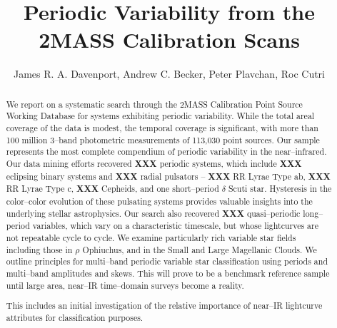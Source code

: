 \documentclass[]{emulateapj}
\begin{document}
 
\title{Periodic Variability from the 2MASS Calibration Scans}


\author{James R. A. Davenport,
Andrew C. Becker,
Peter Plavchan,
Roc Cutri}

 



\begin{abstract}

We report on a systematic search through the 2MASS Calibration Point
Source Working Database for systems exhibiting periodic variability.
While the total areal coverage of the data is modest, the temporal
coverage is significant, with more than 100 million 3--band
photometric measurements of 113,030 point sources.  Our sample
represents the most complete compendium of periodic variability in the
near--infrared.  Our data mining efforts recovered {\bf XXX} periodic
systems, which include {\bf XXX} eclipsing binary systems and {\bf
  XXX} radial pulsators -- {\bf XXX} RR Lyrae Type ab, {\bf XXX} RR
Lyrae Type c, {\bf XXX} Cepheids, and one short--period $\delta$ Scuti
star.  Hysteresis in the color--color evolution of these pulsating
systems provides valuable insights into the underlying stellar
astrophysics.  Our search also recovered {\bf XXX} quasi--periodic
long--period variables, which vary on a characteristic timescale, but
whose lightcurves are not repeatable cycle to cycle.  We examine
particularly rich variable star fields including those in $\rho$
Ophiuchus, and in the Small and Large Magellanic Clouds.  We outline
principles for multi--band periodic variable star classification using
periods and multi--band amplitudes and skews.  This will prove to be a
benchmark reference sample until large area, near--IR time--domain
surveys become a reality.

This includes an initial investigation of the relative importance of
near--IR lightcurve attributes for classification purposes.

\end{abstract}
\end{document}
